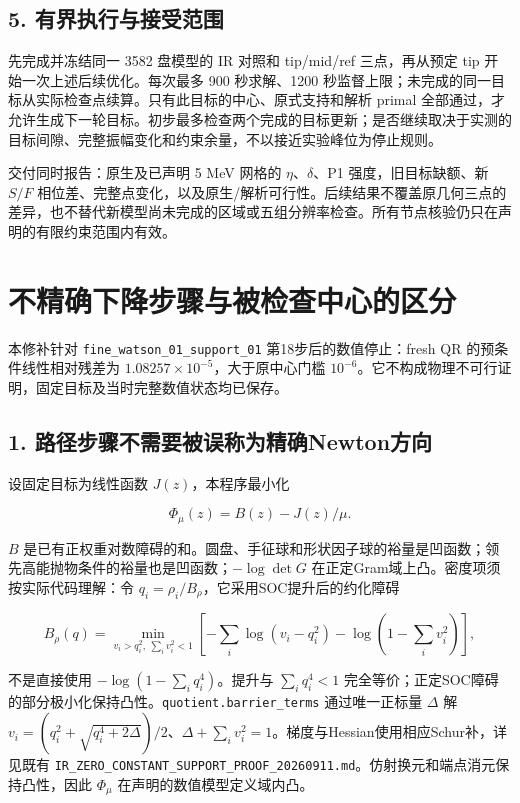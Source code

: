 \documentclass[
  10pt,
  a4paper,
]{article}
\begin{document}
\subsection{5.
有界执行与接受范围}\label{ux6709ux754cux6267ux884cux4e0eux63a5ux53d7ux8303ux56f4}

先完成并冻结同一 3582 盘模型的 IR 对照和 tip/mid/ref 三点，再从预定 tip
开始一次上述后续优化。每次最多 900 秒求解、1200
秒监督上限；未完成的同一目标从实际检查点续算。只有此目标的中心、原式支持和解析
primal
全部通过，才允许生成下一轮目标。初步最多检查两个完成的目标更新；是否继续取决于实测的目标间隙、完整振幅变化和约束余量，不以接近实验峰位为停止规则。

交付同时报告：原生及已声明 5 MeV 网格的 \(\eta\)、\(\delta\)、P1
强度，旧目标缺额、新 \(S/F\)
相位差、完整点变化，以及原生/解析可行性。后续结果不覆盖原几何三点的差异，也不替代新模型尚未完成的区域或五组分辨率检查。所有节点核验仍只在声明的有限约束范围内有效。

\newpage

\section{不精确下降步骤与被检查中心的区分}\label{ux4e0dux7cbeux786eux4e0bux964dux6b65ux9aa4ux4e0eux88abux68c0ux67e5ux4e2dux5fc3ux7684ux533aux5206}

本修补针对 \texttt{fine\_watson\_01\_support\_01}
第18步后的数值停止：fresh QR 的预条件线性相对残差为
\(1.08257\times10^{-5}\)，大于原中心门槛
\(10^{-6}\)。它不构成物理不可行证明，固定目标及当时完整数值状态均已保存。

\subsection{1.
路径步骤不需要被误称为精确Newton方向}\label{ux8defux5f84ux6b65ux9aa4ux4e0dux9700ux8981ux88abux8befux79f0ux4e3aux7cbeux786enewtonux65b9ux5411}

设固定目标为线性函数 \(J(z)\)，本程序最小化

\[
\Phi_\mu(z)=B(z)-J(z)/\mu.
\]

\(B\)
是已有正权重对数障碍的和。圆盘、手征球和形状因子球的裕量是凹函数；领先高能抛物条件的裕量也是凹函数；\(-\log\det G\)
在正定Gram域上凸。密度项须按实际代码理解：令
\(q_i=\rho_i/B_\rho\)，它采用SOC提升后的约化障碍

\[
B_\rho(q)=\min_{v_i>q_i^2,\ \sum_i v_i^2<1}
\left[-\sum_i\log(v_i-q_i^2)-\log(1-\sum_i v_i^2)\right],
\]

不是直接使用 \(-\log(1-\sum_iq_i^4)\)。提升与 \(\sum_iq_i^4<1\)
完全等价；正定SOC障碍的部分极小化保持凸性。\texttt{quotient.barrier\_terms}
通过唯一正标量 \(\Delta\) 解
\(v_i=(q_i^2+\sqrt{q_i^4+2\Delta})/2\)、\(\Delta+\sum_iv_i^2=1\)。梯度与Hessian使用相应Schur补，详见既有
\texttt{IR\_ZERO\_CONSTANT\_SUPPORT\_PROOF\_20260911.md}。仿射换元和端点消元保持凸性，因此
\(\Phi_\mu\) 在声明的数值模型定义域内凸。
\end{document}
